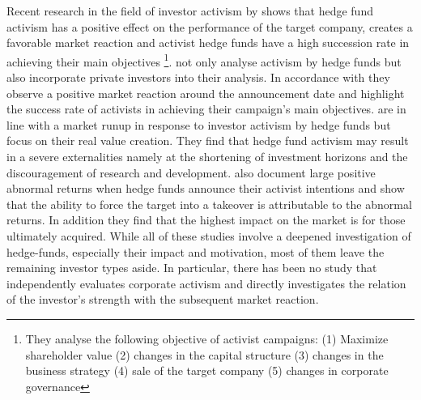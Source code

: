 \documentclass[12pt]{article}
\begin{document}
Recent research in the field of investor activism by \citet{Brav2008} shows that hedge fund activism has a positive effect on the performance of the target company, creates a favorable market reaction and activist hedge funds have a high succession rate in achieving their main objectives \footnote{They analyse the following objective of activist campaigns: (1) Maximize shareholder value (2) changes in the capital structure (3) changes in the business strategy (4) sale of the target company (5) changes in corporate governance}.
\citet{Klein2009} not only analyse activism by hedge funds but also incorporate private investors into their analysis. In accordance with \citet{Brav2008} they observe a positive market reaction around the announcement date and highlight the success rate of activists in achieving their campaign's main objectives.
\citet{CoffeeJr.2014} are in line with a market runup in response to investor activism by hedge funds but focus on their real value creation. They find that hedge fund activism may result in a severe externalities namely at the shortening of investment horizons and the discouragement of research and development. \citet{Greenwood2009} also document large positive abnormal returns when hedge funds announce their activist intentions and show that the ability to force the target into a takeover is attributable to the abnormal returns. In addition they find that the highest impact on the market is for those ultimately acquired.
While all of these studies involve a deepened investigation of hedge-funds, especially their impact and motivation, most of them leave the remaining investor types aside. In particular, there has been no study that independently evaluates corporate activism and directly investigates the relation of the investor's strength with the subsequent market reaction. 
\end{document}
